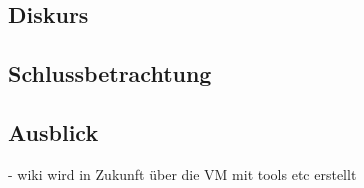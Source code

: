 \begin{otherlanguage}{ngerman}
\section{Diskurs}
\subsection{Schlussbetrachtung}
\subsection{Ausblick}
- wiki wird in Zukunft über die VM mit tools etc erstellt
\end{otherlanguage}